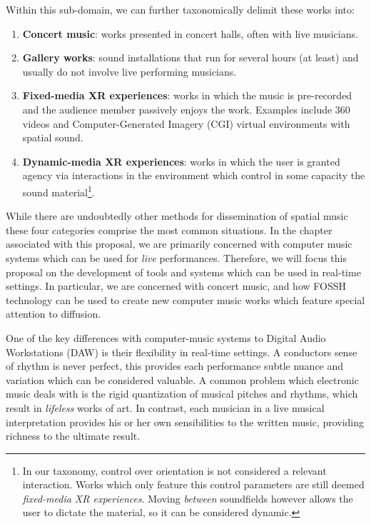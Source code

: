 Within this sub-domain, we can further taxonomically delimit these works into:
\begin{enumerate}
    \item \textbf{Concert music}: works presented in concert halls, often with live musicians. 
    \item \textbf{Gallery works}: sound installations that run for several hours (at least) and usually do not involve live performing musicians. 
    \item \textbf{Fixed-media XR experiences}: works in which the music is pre-recorded and the audience member passively enjoys the work. Examples include 360 videos and Computer-Generated Imagery (CGI) virtual environments with spatial sound. 
    \item \textbf{Dynamic-media XR experiences}: works in which the user is granted agency via interactions in the environment which control in some capacity the sound material\footnote{In our taxonomy, control over orientation is not considered a relevant interaction. Works which only feature this control parameters are still deemed \textit{fixed-media XR experiences}. Moving \textit{between} soundfields however allows the user to dictate the material, so it can be considered dynamic. }.
\end{enumerate}

While there are undoubtedly other methods for dissemination of spatial music these four categories comprise the most common situations. In the chapter associated with this proposal, we are primarily concerned with computer music systems which can be used for \textit{live} performances. Therefore, we will focus this proposal on the development of tools and systems which can be used in real-time settings. In particular, we are concerned with concert music, and how FOSSH technology can be used to create new computer music works which feature special attention to diffusion.

One of the key differences with computer-music systems to Digital Audio Workstations (DAW) is their flexibility in real-time settings. A conductors sense of rhythm is never perfect, this provides each performance subtle nuance and variation which can be considered valuable. A common problem which electronic music deals with is the rigid quantization of musical pitches and rhythms, which result in \textit{lifeless} works of art. In contrast, each musician in a live musical interpretation provides his or her own sensibilities to the written music, providing richness to the ultimate result. 

